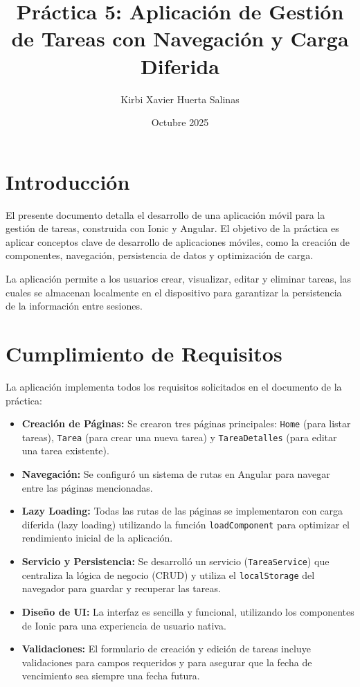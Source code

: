\documentclass{article}
\title{Pr\'actica 5: Aplicaci\'on de Gesti\'on de Tareas con Navegaci\'on y Carga Diferida}
\author{Kirbi Xavier Huerta Salinas}
\date{Octubre 2025}
\begin{document}
\maketitle

\section{Introducci\'on}
El presente documento detalla el desarrollo de una aplicaci\'on m\'ovil para la gesti\'on de tareas, construida con Ionic y Angular. El objetivo de la pr\'actica es aplicar conceptos clave de desarrollo de aplicaciones m\'oviles, como la creaci\'on de componentes, navegaci\'on, persistencia de datos y optimizaci\'on de carga.

La aplicaci\'on permite a los usuarios crear, visualizar, editar y eliminar tareas, las cuales se almacenan localmente en el dispositivo para garantizar la persistencia de la informaci\'on entre sesiones.

\section{Cumplimiento de Requisitos}
La aplicaci\'on implementa todos los requisitos solicitados en el documento de la pr\'actica:
\begin{itemize}
    \item \textbf{Creaci\'on de P\'aginas:} Se crearon tres p\'aginas principales: \texttt{Home} (para listar tareas), \texttt{Tarea} (para crear una nueva tarea) y \texttt{TareaDetalles} (para editar una tarea existente).
    \item \textbf{Navegaci\'on:} Se configur\'o un sistema de rutas en Angular para navegar entre las p\'aginas mencionadas.
    \item \textbf{Lazy Loading:} Todas las rutas de las p\'aginas se implementaron con carga diferida (lazy loading) utilizando la funci\'on \texttt{loadComponent} para optimizar el rendimiento inicial de la aplicaci\'on.
    \item \textbf{Servicio y Persistencia:} Se desarroll\'o un servicio (\texttt{TareaService}) que centraliza la l\'ogica de negocio (CRUD) y utiliza el \texttt{localStorage} del navegador para guardar y recuperar las tareas.
    \item \textbf{Dise\~no de UI:} La interfaz es sencilla y funcional, utilizando los componentes de Ionic para una experiencia de usuario nativa.
    \item \textbf{Validaciones:} El formulario de creaci\'on y edici\'on de tareas incluye validaciones para campos requeridos y para asegurar que la fecha de vencimiento sea siempre una fecha futura.
\end{itemize}
\end{document}
